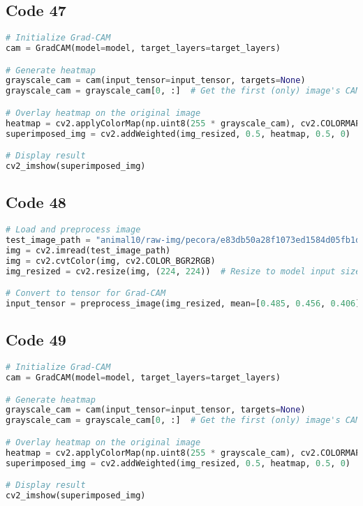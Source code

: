 \documentclass{article}
\begin{document}
\subsection*{Code 47}
\begin{lstlisting}[language=Python]
# Initialize Grad-CAM
cam = GradCAM(model=model, target_layers=target_layers)

# Generate heatmap
grayscale_cam = cam(input_tensor=input_tensor, targets=None)
grayscale_cam = grayscale_cam[0, :]  # Get the first (only) image's CAM

# Overlay heatmap on the original image
heatmap = cv2.applyColorMap(np.uint8(255 * grayscale_cam), cv2.COLORMAP_JET)
superimposed_img = cv2.addWeighted(img_resized, 0.5, heatmap, 0.5, 0)

# Display result
cv2_imshow(superimposed_img)
\end{lstlisting}

\subsection*{Code 48}
\begin{lstlisting}[language=Python]
# Load and preprocess image
test_image_path = "animal10/raw-img/pecora/e83db50a28f1073ed1584d05fb1d4e9fe777ead218ac104497f5c978a6ebb3bf_640.jpg"  # Change path to an actual image
img = cv2.imread(test_image_path)
img = cv2.cvtColor(img, cv2.COLOR_BGR2RGB)
img_resized = cv2.resize(img, (224, 224))  # Resize to model input size

# Convert to tensor for Grad-CAM
input_tensor = preprocess_image(img_resized, mean=[0.485, 0.456, 0.406], std=[0.229, 0.224, 0.225])
\end{lstlisting}

\subsection*{Code 49}
\begin{lstlisting}[language=Python]
# Initialize Grad-CAM
cam = GradCAM(model=model, target_layers=target_layers)

# Generate heatmap
grayscale_cam = cam(input_tensor=input_tensor, targets=None)
grayscale_cam = grayscale_cam[0, :]  # Get the first (only) image's CAM

# Overlay heatmap on the original image
heatmap = cv2.applyColorMap(np.uint8(255 * grayscale_cam), cv2.COLORMAP_JET)
superimposed_img = cv2.addWeighted(img_resized, 0.5, heatmap, 0.5, 0)

# Display result
cv2_imshow(superimposed_img)
\end{lstlisting}
\end{document}
